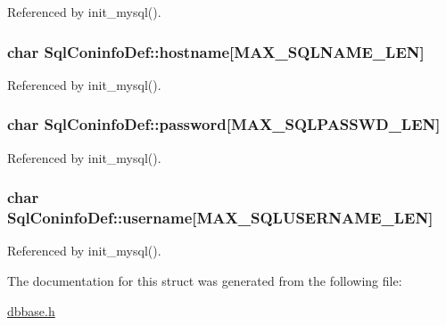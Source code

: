 Referenced by init\-\_\-mysql().

\hypertarget{structSqlConinfoDef_a92dd97dc90ef98dc5e94873c3e7ecba0}{
\subsubsection[{hostname}]{\setlength{\rightskip}{0pt plus 5cm}char Sql\-Coninfo\-Def\-::hostname\mbox{[}{\bf M\-A\-X\-\_\-\-S\-Q\-L\-N\-A\-M\-E\-\_\-\-L\-E\-N}\mbox{]}}}\label{structSqlConinfoDef_a92dd97dc90ef98dc5e94873c3e7ecba0}


Referenced by init\-\_\-mysql().

\hypertarget{structSqlConinfoDef_af063d8739c1418a68dd2c7b949440600}{
\subsubsection[{password}]{\setlength{\rightskip}{0pt plus 5cm}char Sql\-Coninfo\-Def\-::password\mbox{[}{\bf M\-A\-X\-\_\-\-S\-Q\-L\-P\-A\-S\-S\-W\-D\-\_\-\-L\-E\-N}\mbox{]}}}\label{structSqlConinfoDef_af063d8739c1418a68dd2c7b949440600}


Referenced by init\-\_\-mysql().

\hypertarget{structSqlConinfoDef_ad5932393c1ac16a9d33378ef2f573440}{
\subsubsection[{username}]{\setlength{\rightskip}{0pt plus 5cm}char Sql\-Coninfo\-Def\-::username\mbox{[}{\bf M\-A\-X\-\_\-\-S\-Q\-L\-U\-S\-E\-R\-N\-A\-M\-E\-\_\-\-L\-E\-N}\mbox{]}}}\label{structSqlConinfoDef_ad5932393c1ac16a9d33378ef2f573440}


Referenced by init\-\_\-mysql().



The documentation for this struct was generated from the following file\-:\begin{DoxyCompactItemize}
\item 
\hyperlink{dbbase_8h}{dbbase.\-h}\end{DoxyCompactItemize}
